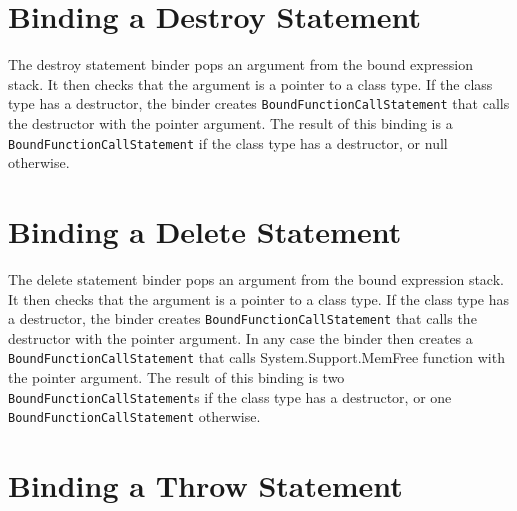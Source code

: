 \documentclass[a4paper,oneside,11pt]{book}
\theoremstyle{definition}
\begin{document}
\section{Binding a Destroy Statement}

The destroy statement binder pops an argument from the bound expression stack.
It then checks that the argument is a pointer to a class type.
If the class type has a destructor, the binder creates \verb|BoundFunctionCallStatement| that calls the destructor with the pointer argument.
The result of this binding is a \verb|BoundFunctionCallStatement| if the class type has a destructor, or null otherwise.

\section{Binding a Delete Statement}

The delete statement binder pops an argument from the bound expression stack.
It then checks that the argument is a pointer to a class type.
If the class type has a destructor, the binder creates \verb|BoundFunctionCallStatement| that calls the destructor with the pointer argument.
In any case the binder then creates a \verb|BoundFunctionCallStatement| that calls System.Support.MemFree function with the pointer argument.
The result of this binding is two \verb|BoundFunctionCallStatement|s if the class type has a destructor, or one \verb|BoundFunctionCallStatement| otherwise.

\section{Binding a Throw Statement}
\end{document}
